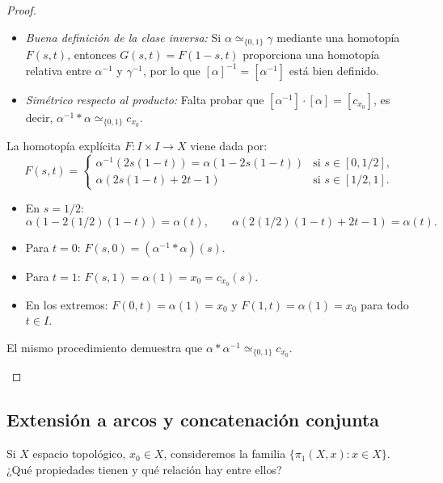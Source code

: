 \begin{proof}
\begin{enumerate}
    \begin{itemize}
        \item \emph{Buena definición de la clase inversa:} Si $\alpha \simeq_{\{0,1\}} \gamma$ mediante una homotopía $F(s, t)$, entonces $G(s, t) = F(1 - s, t)$ proporciona una homotopía relativa entre $\alpha^{-1}$ y $\gamma^{-1}$, por lo que $[\alpha]^{-1} = [\alpha^{-1}]$ está bien definido.
        \item \emph{Simétrico respecto al producto:} Falta probar que $[\alpha^{-1}] \cdot [\alpha] = [c_{x_0}]$, es decir, $\alpha^{-1} * \alpha \simeq_{\{0,1\}} c_{x_0}$.
    \end{itemize}
    La homotopía explícita $F : I \times I \to X$ viene dada por:
    \[
    F(s, t) = 
    \begin{cases}
    \alpha^{-1}(2s(1 - t)) = \alpha(1 - 2s(1 - t)) & \text{si } s \in [0, 1/2], \\[1ex]
    \alpha(2s(1 - t) + 2t - 1) & \text{si } s \in [1/2, 1].
    \end{cases}
    \]
    \begin{itemize}
        \item En $s = 1/2$:
        \[
        \alpha(1 - 2(1/2)(1 - t)) = \alpha(t), \qquad \alpha(2(1/2)(1 - t) + 2t - 1) = \alpha(t).
        \]
        \item Para $t = 0$: $F(s, 0) = (\alpha^{-1} * \alpha)(s)$.
        \item Para $t = 1$: $F(s, 1) = \alpha(1) = x_0 = c_{x_0}(s)$.
        \item En los extremos: $F(0, t) = \alpha(1) = x_0$ y $F(1, t) = \alpha(1) = x_0$ para todo $t \in I$.
    \end{itemize}
    El mismo procedimiento demuestra que $\alpha * \alpha^{-1} \simeq_{\{0,1\}} c_{x_0}$.
\end{enumerate}

\end{proof}

\subsection{Extensión a arcos y concatenación conjunta}

Si $X$ espacio topológico, $x_0 \in X$, consideremos la familia $\{\pi_1(X, x) : x \in X\}$. ¿Qué propiedades tienen y qué relación hay entre ellos?

